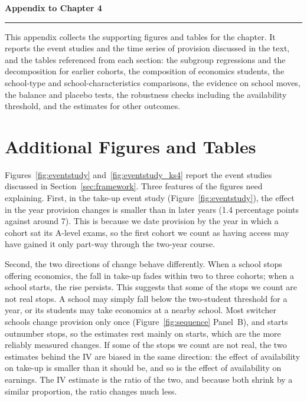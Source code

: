 \begin{center}
  {\LARGE\bfseries Appendix to Chapter 4}\\[6pt]
  \rule{0.5\linewidth}{0.4pt}
\end{center}
\medskip
\noindent This appendix collects the supporting figures and tables for the
chapter. It reports the event studies and the time series of provision
discussed in the text, and the tables referenced from each section: the
subgroup regressions and the decomposition for earlier cohorts, the
composition of economics students, the school-type and
school-characteristics comparisons, the evidence on school moves, the
balance and placebo tests, the robustness checks including the
availability threshold, and the estimates for other outcomes.
\medskip

\section{Additional Figures and Tables}
\label{sec:Appendix_FigTab}






Figures~\ref{fig:eventstudy} and~\ref{fig:eventstudy_ks4} report the event studies discussed in Section~\ref{sec:framework}. Three features of the figures need explaining. First, in the take-up event study (Figure~\ref{fig:eventstudy}), the effect in the year provision changes is smaller than in later years (1.4 percentage points against around 7). This is because we date provision by the year in which a cohort sat its A-level exams, so the first cohort we count as having access may have gained it only part-way through the two-year course.

Second, the two directions of change behave differently. When a school stops offering economics, the fall in take-up fades within two to three cohorts; when a school starts, the rise persists. This suggests that some of the stops we count are not real stops. A school may simply fall below the two-student threshold for a year, or its students may take economics at a nearby school. Most switcher schools change provision only once (Figure~\ref{fig:sequence} Panel~B), and starts outnumber stops, so the estimates rest mainly on starts, which are the more reliably measured changes. If some of the stops we count are not real, the two estimates behind the IV are biased in the same direction: the effect of availability on take-up is smaller than it should be, and so is the effect of availability on earnings. The IV estimate is the ratio of the two, and because both shrink by a similar proportion, the ratio changes much less.

